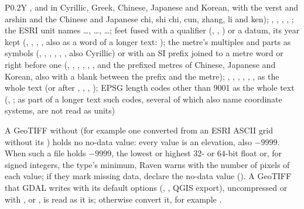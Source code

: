 \begin{table}[!htbp]
\begin{tabularx}{\linewidth}{P{0.2\linewidth}Y}
, and in Cyrillic, Greek, Chinese, Japanese and Korean, with the verst and arshin and the Chinese and Japanese
chi, shi chi, cun, zhang, li and ken); , , , ,
; the ESRI unit names \dots, \dots, \dots; feet fused with a qualifier
(, , ) or a datum, its year kept (, , ,
, also as a word of a longer text: ); the metre's multiples and parts as symbols (, , ,
, , , also Cyrillic) or with an SI prefix joined to a metre word or right before one
(, , , , , , and
the prefixed metres of Chinese, Japanese and Korean, also with a blank between the prefix and the metre);
, , , , , ,  as the whole text (or after ,
, , ); EPSG length codes other than 9001 as the whole text (,
; as part of a longer text such codes, several of which also name coordinate systems,
are not read as units)\\\bottomrule
\end{tabularx}
\end{table}

A GeoTIFF without  (for example one converted from an ESRI ASCII grid without its )
holds no no-data value: every value is an elevation, also $-9999$. When such a file holds $-9999$, the lowest or highest
32- or 64-bit float or, for signed integers, the type's minimum, Raven warns with the number of pixels of each value; if
they mark missing data, declare the no-data value (). A GeoTIFF that GDAL
writes with its default options (, , QGIS export), uncompressed or with
,  or , is read as it is; otherwise convert it, for example
.

